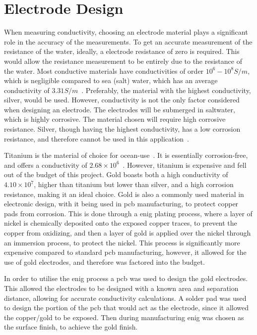 \section{Electrode Design}\label{sec:electrode_design}
When measuring conductivity, choosing an electrode material plays a significant role in the accuracy of the measurements.
To get an accurate measurement of the resistance of the water, ideally, a electrode resistance of zero is required.
This would allow the resistance measurement to be entirely due to the resistance of the water.
Most conductive materials have conductivities of order $10^6 - 10^8 S/m$, which is negligible compared to sea (salt) water, which has an average conductivity of $3.31 S/m$~\cite{conductivities}\cite{ocean_conductivity_tyler}.
Preferably, the material with the highest conductivity, silver, would be used. However, conductivity is not the only factor considered when designing an electrode. 
The electrodes will be submerged in saltwater, which is highly corrosive. The material chosen will require high corrosive resistance. 
Silver, though having the highest conductivity, has a low corrosion resistance, and therefore cannot be used in this application~\cite{zhang_silver}.

Titanium is the material of choice for ocean-use~\cite{materials_ocean_structures}. It is essentially corrosion-free, and offers a conductivity of $2.68\times 10^{6}$~\cite{conductivities}.
However, titanium is expensive and fell out of the budget of this project.
Gold boasts both a high conductivity of $4.10\times 10^{7}$, higher than titanium but lower than silver, and a high corrosion resistance, making it an ideal choice.
Gold is also a commonly used material in electronic design, with it being used in \gls{pcb} manufacturing, to protect copper pads from corrosion.
This is done through a \gls{enig} plating process, where a layer of nickel is chemically deposited onto the exposed copper traces, to prevent the copper from oxidizing, and then a layer of gold is applied over the nickel through an immersion process, to protect the nickel.
This process is significantly more expensive compared to standard \gls{pcb} manufacturing, however, it allowed for the use of gold electrodes, and therefore was factored into the budget. 

In order to utilise the \gls{enig} process a \gls{pcb} was used to design the gold electrodes.
This allowed the electrodes to be designed with a known area and separation distance, allowing for accurate conductivity calculations.
A solder pad was used to design the portion of the \gls{pcb} that would act as the electrode, since it allowed the copper/gold to be exposed.
Then during manufacturing \gls{enig} was chosen as the surface finish, to achieve the gold finish.

